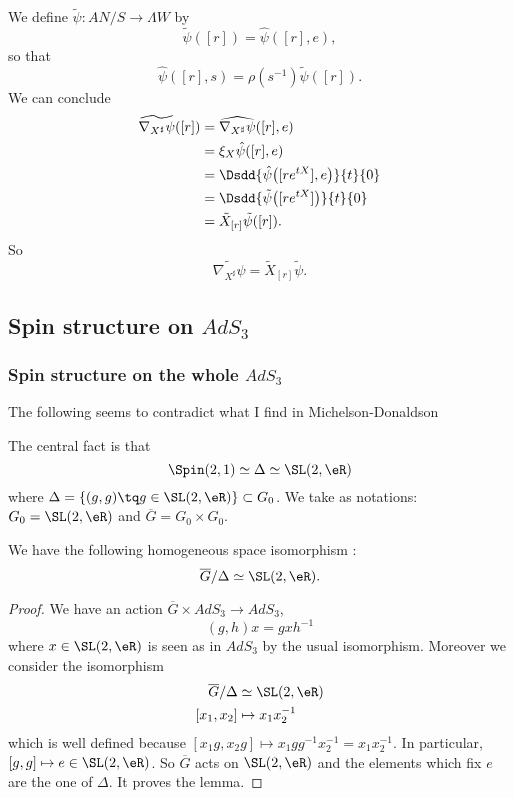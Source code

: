 We define $\tilde{\psi}\colon AN/S\to \Lambda W$ by 
\[ 
  \tilde{\psi}([r])=\hat{\psi}( [r],e ),
\]
so that
\begin{equation}
\hat{\psi}([r],s)=\rho(s^{-1})\tilde{\psi}([r]).
\end{equation}
We can conclude
\[ 
\begin{split}
\widetilde{ \nabla_{X^{\sharp}}\psi  }([r])&=\widehat{\nabla_{X^{\sharp}}\psi}([r],e)\\
        &=\xi_{X}\hat{\psi}([r],e)\\
        &=\Dsdd{ \hat{\psi}\big( [r e^{tX}],e \big) }{t}{0}\\
        &=\Dsdd{ \tilde{\psi}\big( [r e^{tX}] \big) }{t}{0}\\
        &=\tilde X_{[r]}\tilde{\psi}([r]).      
\end{split}  
\]
So
\begin{equation}
\widetilde{\nabla_{X^{\sharp}}\psi}=\tilde X_{[r]}\tilde{\psi}.
\end{equation}

\subsection{Spin structure on \texorpdfstring{$AdS_3$}{AdS3} }

\subsubsection{Spin structure on the whole \texorpdfstring{$AdS_3$}{AdS3} }

\begin{probleme}
    The following seems to contradict what I find in Michelson-Donaldson
\end{probleme}
The central fact is that
\[ 
  \Spin(2,1)\simeq\Delta\simeq\SL(2,\eR)
\]
where $\Delta=\{ (g,g)\tq g\in\SL(2,\eR) \}\subset G_0$. We take as notations: $G_{0}=\SL(2,\eR)$ and $\overline{G}=G_0\times G_{0}$. 

\begin{lemma}
We have the following homogeneous space isomorphism :
\[ 
  \overline{G}/\Delta\simeq\SL(2,\eR).
\]
\end{lemma}

\begin{proof} 

We have an action $\overline{G}\times AdS_3\to AdS_3$,
\begin{equation} \label{EqActghgxh}
  (g,h)x=gxh^{-1}
\end{equation}
where $x\in\SL(2,\eR)$ is seen as in $AdS_3$ by the usual isomorphism. Moreover we consider the isomorphism
\begin{align}
\overline{G}/\Delta&\simeq\SL(2,\eR)\\
[x_1,x_2]&\mapsto x_1x_2^{-1}
\end{align}
which is well defined because $[x_1g,x_2g]\mapsto x_1gg^{-1}x_2^{-1}=x_1x_2^{-1}$. In particular, $[g,g]\mapsto e\in\SL(2,\eR)$. So $\overline{G}$ acts on $\SL(2,\eR)$ and the elements which fix $e$ are the one of $\Delta$. It proves the lemma.
\end{proof}

